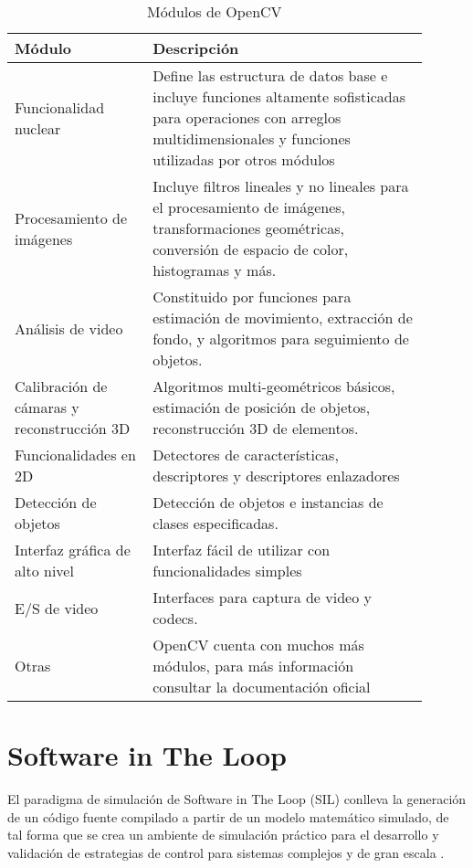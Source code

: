 \begin{table}[ht]
    \centering
    \begin{tabular}{p{0.3\linewidth}p{0.6\linewidth}}
        \hline
        \textbf{Módulo} & \textbf{Descripción}\\ \hline \hline
        Funcionalidad nuclear & Define las estructura de datos base e incluye funciones altamente sofisticadas para operaciones con arreglos multidimensionales y funciones utilizadas por otros módulos \\ \hline
        Procesamiento de imágenes & Incluye filtros lineales y no lineales para el procesamiento de imágenes, transformaciones geométricas, conversión de espacio de color, histogramas y más.\\ \hline
        Análisis de video & Constituido por funciones para estimación de movimiento, extracción de fondo, y algoritmos para seguimiento de objetos.\\ \hline
        Calibración de cámaras y reconstrucción 3D & Algoritmos multi-geométricos básicos, estimación de posición de objetos, reconstrucción  3D de elementos.\\ \hline
        Funcionalidades en 2D &  Detectores de características, descriptores y descriptores enlazadores\\ \hline
        Detección de objetos & Detección de objetos e instancias de clases especificadas.\\ \hline
        Interfaz gráfica de alto nivel & Interfaz fácil de utilizar con funcionalidades simples\\ \hline
        E/S de video & Interfaces para captura de video y codecs.\\ \hline 
        Otras & OpenCV cuenta con muchos más módulos, para más información consultar la documentación oficial \cite{OpenCV}\\ \hline \hline
    \end{tabular}
    \caption{Módulos de OpenCV}
    \label{tab:OpenCV}
\end{table}

\section{Software in The Loop}

El paradigma de simulación de Software in The Loop (SIL) conlleva la generación de un código fuente compilado a partir de un modelo matemático simulado, de tal forma que se crea un ambiente de simulación práctico para el desarrollo y validación de estrategias de control para sistemas complejos y de gran escala \cite{SIL_OPAL}. 

